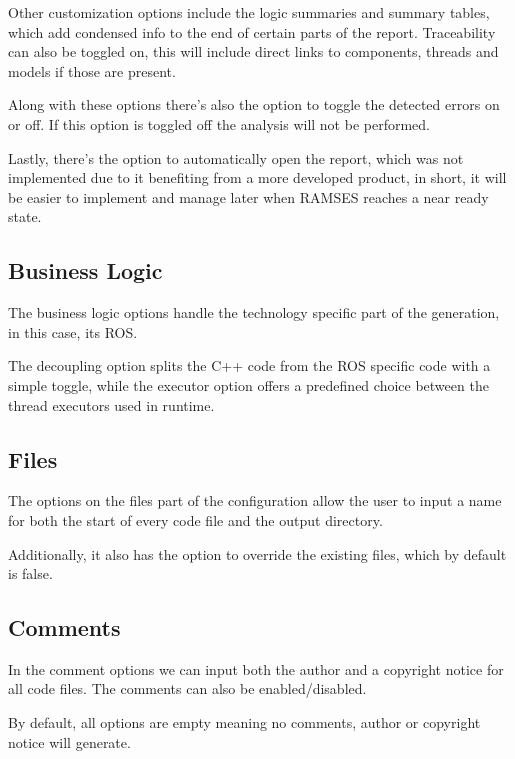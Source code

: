 Other customization options include the logic summaries and summary tables, which add condensed info to the end of certain parts of the report. Traceability can also be toggled on, this will include direct links to components, threads and models if those are present.

Along with these options there's also the option to toggle the detected errors on or off. If this option is toggled off the analysis will not be performed.

Lastly, there's the option to automatically open the report, which was not implemented due to it benefiting from a more developed product, in short, it will be easier to implement and manage later when \gls{RAMSES} reaches a near ready state.


\subsection{Business Logic}
\label{sec:dsl_business_logic}

The business logic options handle the technology specific part of the generation, in this case, its \gls{ROS}. 

The decoupling option splits the C++ code from the \gls{ROS} specific code with a simple toggle, while the executor option offers a predefined choice between the thread executors used in runtime.


\subsection{Files}
\label{sec:dsl_files}

The options on the files part of the configuration allow the user to input a name for both the start of every code file and the output directory.

Additionally, it also has the option to override the existing files, which by default is false.



\subsection{Comments}
\label{sec:dsl_comments}

In the comment options we can input both the author and a copyright notice for all code files. The comments can also be enabled/disabled. 

By default, all options are empty meaning no comments, author or copyright notice will generate.




